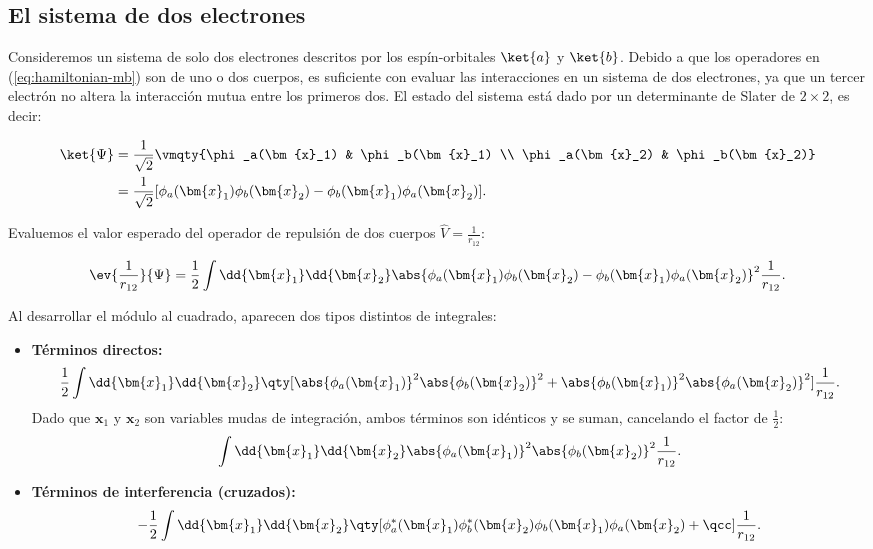 \subsection{El sistema de dos electrones}

Consideremos un sistema de solo dos electrones descritos por los espín-orbitales \( \ket{a} \) y \( \ket{b} \). Debido a que los operadores en (\ref{eq:hamiltonian-mb}) son de uno o dos cuerpos, es suficiente con evaluar las interacciones en un sistema de dos electrones, ya que un tercer electrón no altera la interacción mutua entre los primeros dos. El estado del sistema está dado por un determinante de Slater de \( 2\times 2 \), es decir:

\begin{align}
\ket{\Psi} &= \frac{1}{\sqrt{2}} \vmqty{\phi_a(\bm{x}_1) & \phi_b(\bm{x}_1) \\ \phi_a(\bm{x}_2) & \phi_b(\bm{x}_2)} \nonumber \\
&= \frac{1}{\sqrt{2}} [\phi_a(\bm{x}_1)\phi_b(\bm{x}_2) - \phi_b(\bm{x}_1)\phi_a(\bm{x}_2)].
\end{align}

Evaluemos el valor esperado del operador de repulsión de dos cuerpos \( \hat{V} = \frac{1}{r_{12}} \):

\begin{equation}
\ev{\frac{1}{r_{12}}}{\Psi} = \frac{1}{2} \int \dd{\bm{x}_1} \dd{\bm{x}_2} \abs{\phi_a(\bm{x}_1)\phi_b(\bm{x}_2) - \phi_b(\bm{x}_1) \phi_a(\bm{x}_2) }^2 \frac{1}{r_{12}}.
\end{equation}

Al desarrollar el módulo al cuadrado, aparecen dos tipos distintos de integrales:

\begin{itemize}
\item \textbf{Términos directos:}
  \begin{equation}
  \frac{1}{2} \int \dd{\bm{x}_1}\dd{\bm{x}_2} \qty[ \abs{\phi_a(\bm{x}_1)}^2 \abs{\phi_b(\bm{x}_2)}^2 + \abs{\phi_b(\bm{x}_1)}^2 \abs{\phi_a(\bm{x}_2)}^2 ]\frac{1}{r_{12}}.
  \end{equation}
  Dado que \( \bm{x}_1 \) y \( \bm{x}_2 \) son variables mudas de integración, ambos términos son idénticos y se suman, cancelando el factor de \( \frac{1}{2} \):
  \begin{equation}
  \int \dd{\bm{x}_1}\dd{\bm{x}_2} \abs{\phi_a(\bm{x}_1)}^2 \abs{\phi_b(\bm{x}_2)}^2 \frac{1}{r_{12}}.
  \end{equation}
\item \textbf{Términos de interferencia (cruzados):}
  \begin{equation}
  - \frac{1}{2} \int \dd{\bm{x}_1}\dd{\bm{x}_2} \qty[ \phi_a^{*}(\bm{x}_1)\phi_b^{*}(\bm{x}_2)\phi_b(\bm{x}_1)\phi_a(\bm{x}_2) + \qcc ]\frac{1}{r_{12}}.
  \end{equation}
\end{itemize}

